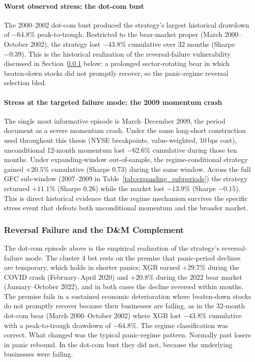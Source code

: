 

\paragraph{Worst observed stress: the dot-com bust}
The 2000--2002 dot-com bust produced the strategy's largest historical drawdown of $-64.8\%$ peak-to-trough. Restricted to the bear-market proper (March 2000--October 2002), the strategy lost $-43.8\%$ cumulative over 32 months (Sharpe $-0.39$). This is the historical realization of the reversal-failure vulnerability discussed in Section~\ref{sec:stress_test} below: a prolonged sector-rotating bear in which beaten-down stocks did not promptly recover, so the panic-regime reversal selection bled.

\paragraph{Stress at the targeted failure mode: the 2009 momentum crash}
The single most informative episode is March--December 2009, the period \citet{DanielMoskowitz2016} document as a severe momentum crash. Under the same long-short construction used throughout this thesis (NYSE breakpoints, value-weighted, 10\,bps cost), unconditional 12-month momentum lost $-62.6\%$ cumulative during those ten months. Under expanding-window out-of-sample, the regime-conditional strategy gained $+20.5\%$ cumulative (Sharpe 0.73) during the same window. Across the full GFC sub-window (2007--2009 in Table~\ref{tab:expanding_subperiods}) the strategy returned $+11.1\%$ (Sharpe 0.26) while the market lost $-13.9\%$ (Sharpe $-0.15$). This is direct historical evidence that the regime mechanism survives the specific stress event that defeats both unconditional momentum and the broader market.

\subsubsection{Reversal Failure and the D\&M Complement}\label{sec:stress_test}

The dot-com episode above is the empirical realization of the strategy's reversal-failure mode. The cluster 4 bet rests on the premise that panic-period declines are temporary, which holds in shorter panics; XGB earned $+29.7\%$ during the COVID crash (February--April 2020) and $+20.8\%$ during the 2022 bear market (January--October 2022), and in both cases the decline reversed within months. The premise fails in a sustained economic deterioration where beaten-down stocks do not promptly recover because their businesses are failing, as in the 32-month dot-com bear (March 2000--October 2002) where XGB lost $-43.8\%$ cumulative with a peak-to-trough drawdown of $-64.8\%$. The regime classification was correct. What changed was the typical panic-regime pattern. Normally past losers in panic rebound. In the dot-com bust they did not, because the underlying businesses were failing.

